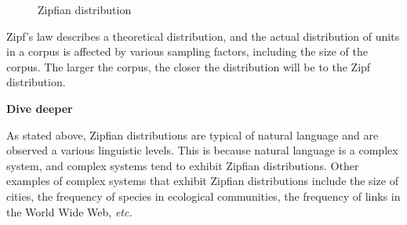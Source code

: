 \documentclass[
  letterpaper,
]{latex/krantz}
\theoremstyle{definition}
\theoremstyle{remark}
\begin{document}
\begin{figure}[H]
\begin{minipage}{0.50\linewidth}


\end{minipage}%

\caption{\label{fig-aa-zipf-distribution}Zipfian distribution}

\end{figure}%

Zipf's law describes a theoretical distribution, and the actual
distribution of units in a corpus is affected by various sampling
factors, including the size of the corpus. The larger the corpus, the
closer the distribution will be to the Zipf distribution.

\begin{tcolorbox}[enhanced jigsaw, colframe=quarto-callout-color-frame, breakable, bottomrule=.15mm, arc=.35mm, left=2mm, opacityback=0, rightrule=.15mm, colback=white, toprule=.15mm, leftrule=.75mm]

\textbf{ Dive deeper}

As stated above, Zipfian distributions are typical of natural language
and are observed a various linguistic levels. This is because natural
language is a complex system, and complex systems tend to exhibit
Zipfian distributions. Other examples of complex systems that exhibit
Zipfian distributions include the size of cities, the frequency of
species in ecological communities, the frequency of links in the World
Wide Web, \emph{etc.}

\end{tcolorbox}
\end{document}
